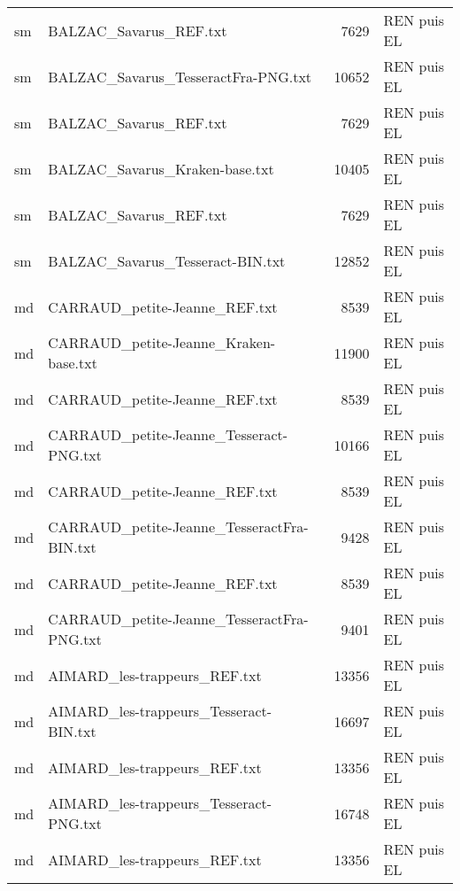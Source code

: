 \begin{tabular}{llrl}
    sm &                             BALZAC\_Savarus\_REF.txt &                  7629 & REN puis EL \\
    sm &                BALZAC\_Savarus\_TesseractFra-PNG.txt &                 10652 & REN puis EL \\
    sm &                             BALZAC\_Savarus\_REF.txt &                  7629 & REN puis EL \\
    sm &                     BALZAC\_Savarus\_Kraken-base.txt &                 10405 & REN puis EL \\
    sm &                             BALZAC\_Savarus\_REF.txt &                  7629 & REN puis EL \\
    sm &                   BALZAC\_Savarus\_Tesseract-BIN.txt &                 12852 & REN puis EL \\
    md &                      CARRAUD\_petite-Jeanne\_REF.txt &                  8539 & REN puis EL \\
    md &              CARRAUD\_petite-Jeanne\_Kraken-base.txt &                 11900 & REN puis EL \\
    md &                      CARRAUD\_petite-Jeanne\_REF.txt &                  8539 & REN puis EL \\
    md &            CARRAUD\_petite-Jeanne\_Tesseract-PNG.txt &                 10166 & REN puis EL \\
    md &                      CARRAUD\_petite-Jeanne\_REF.txt &                  8539 & REN puis EL \\
    md &         CARRAUD\_petite-Jeanne\_TesseractFra-BIN.txt &                  9428 & REN puis EL \\
    md &                      CARRAUD\_petite-Jeanne\_REF.txt &                  8539 & REN puis EL \\
    md &         CARRAUD\_petite-Jeanne\_TesseractFra-PNG.txt &                  9401 & REN puis EL \\
    md &                       AIMARD\_les-trappeurs\_REF.txt &                 13356 & REN puis EL \\
    md &             AIMARD\_les-trappeurs\_Tesseract-BIN.txt &                 16697 & REN puis EL \\
    md &                       AIMARD\_les-trappeurs\_REF.txt &                 13356 & REN puis EL \\
    md &             AIMARD\_les-trappeurs\_Tesseract-PNG.txt &                 16748 & REN puis EL \\
    md &                       AIMARD\_les-trappeurs\_REF.txt &                 13356 & REN puis EL \\

\end{tabular}
